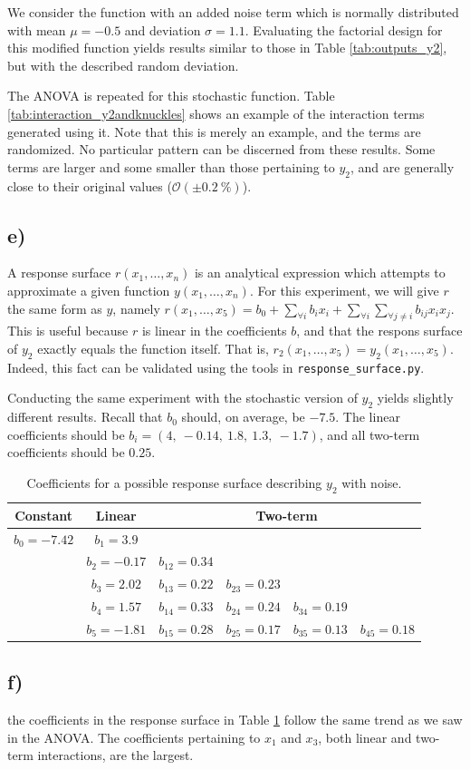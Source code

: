 We consider the function with an added noise term which is normally distributed with mean $\mu = -0.5$ and deviation $\sigma = 1.1$. Evaluating the factorial design for this modified function yields results similar to those in Table \ref{tab:outputs_y2}, but with the described random deviation.

The ANOVA is repeated for this stochastic function. Table \ref{tab:interaction_y2andknuckles} shows an example of the interaction terms generated using it. Note that this is merely an example, and the terms are randomized. No particular pattern can be discerned from these results. Some terms are larger and some smaller than those pertaining to $y_2$, and are generally close to their original values ($\mathcal{O}(\pm 0.2\ \%)$).

\subsection*{e)}

A response surface $r(x_1, \dots, x_n)$ is an analytical expression which attempts to approximate a given function $y(x_1, \dots, x_n)$. For this experiment, we will give $r$ the same form as $y$, namely $r(x_1, \dots, x_5) = b_0 + \sum_{\forall i} b_i x_i + \sum_{\forall i} \sum_{\forall j \neq i} b_{ij} x_i x_j$. This is useful because $r$ is linear in the coefficients $b$, and that the respons surface of $y_2$ exactly equals the function itself. That is, $r_2(x_1, \dots, x_5) = y_2(x_1, \dots, x_5)$. Indeed, this fact can be validated using the tools in \texttt{response\_surface.py}.

Conducting the same experiment with the stochastic version of $y_2$ yields slightly different results. Recall that $b_0$ should, on average, be $-7.5$. The linear coefficients should be $b_i = (4,\ -0.14,\ 1.8,\ 1.3,\ -1.7)$, and all two-term coefficients should be $0.25$.

\begin{table}[h!]
\centering
\begin{tabular}{c|c|cccc}
	  Constant    &    Linear     &                     \multicolumn{4}{c}{Two-term}                      \\ \hline
	$b_0 = -7.42$ &  $b_1 = 3.9$  &                 &                 &                 &                 \\
	              & $b_2 = -0.17$ & $b_{12} = 0.34$ &                 &                 &                 \\
	              & $b_3 = 2.02$  & $b_{13} = 0.22$ & $b_{23} = 0.23$ &                 &                 \\
	              & $b_4 = 1.57$  & $b_{14} = 0.33$ & $b_{24} = 0.24$ & $b_{34} = 0.19$ &                 \\
	              & $b_5 = -1.81$ & $b_{15} = 0.28$ & $b_{25} = 0.17$ & $b_{35} = 0.13$ & $b_{45} = 0.18$
\end{tabular}
\caption{Coefficients for a possible response surface describing $y_2$ with noise.}
\label{tab:noisy_sufrace}
\end{table}

\subsection*{f)}

the coefficients in the response surface in Table \ref{tab:noisy_sufrace} follow the same trend as we saw in the ANOVA. The coefficients pertaining to $x_1$ and $x_3$, both linear and two-term interactions, are the largest.